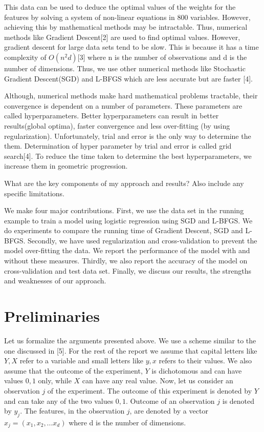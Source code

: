 \documentclass{acm_proc_article-sp}
\begin{document}
This data can be used to deduce the optimal values of the weights for the features by solving a system of non-linear equations in 800 variables. However, achieving this by mathematical methods may be intractable. Thus, numerical methods like Gradient Descent[2] are used to find optimal values. However, gradient descent for large data sets tend to be slow. This is because it has a time complexity of $O(n^{2}d)$[3] where n is the number of observations and d is the number of dimensions. Thus, we use other numerical methods like Stochastic Gradient Descent(SGD) and L-BFGS which are less accurate but are faster [4].

Although, numerical methods make hard mathematical problems tractable, their convergence is dependent on a number of parameters. These parameters are called hyperparameters. Better hyperparameters can result in better results(global optima), faster convergence and less over-fitting (by using regularization). Unfortunately, trial and error is the only way to determine the them. Determination of hyper parameter by trial and error is called grid search[4]. To reduce the time taken to determine the best hyperparameters, we increase them in geometric progression.

What are the key components of my approach and results? Also include any specific limitations.

We make four major contributions. First, we use the data set in the running example to train a model using logistic regression using SGD and L-BFGS. We do experiments to compare the running time of Gradient Descent, SGD and L-BFGS. Secondly, we have used regularization and cross-validation to prevent the model over-fitting the data. We report the performance of the model with and without these measures. Thirdly, we also report the accuracy of the model on cross-validation and test data set. Finally, we discuss our results, the strengths and weaknesses of our approach.

\section{Preliminaries}
Let us formalize the arguments presented above. We use a scheme similar to the one discussed in [5]. For the rest of the report we assume that capital letters like $Y, X$ refer to a variable and small letters like $y, x$ refers to their values. We also assume that the outcome of the experiment, $Y$ is dichotomous and can have values ${0,1}$ only, while $X$ can have any real value. Now, let us consider an observation $j$ of the experiment. The outcome of this experiment is denoted by $Y$ and can take any of the two values ${0,1}$. Outcome of an observation $j$ is denoted by $y_{j}$. The features, in the observation $j$, are denoted by a vector $x_{j}=(x_{1}, x_{2},...x_{d})$ where d is the number of dimensions. 
\end{document}
